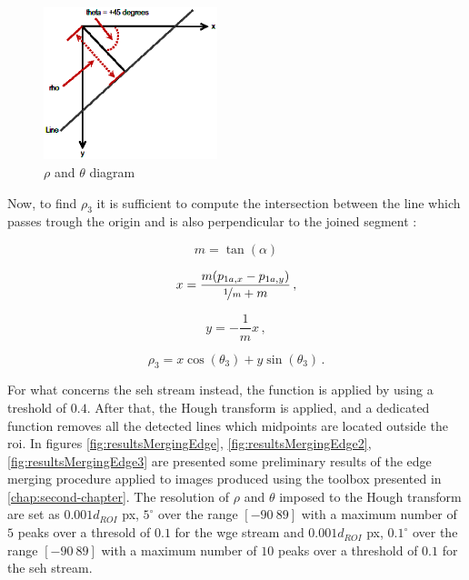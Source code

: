 \begin{figure}[htbp]
  \centering
  \includegraphics[width=0.45\textwidth]{gfx/hough_rho_theta_diagram.eps}
  \caption{$\rho$ and $\theta$ diagram}
  \label{fig:rhotheta}
\end{figure}

Now, to find $\rho_3$ it is sufficient to compute the intersection between the line which passes trough the origin and is also perpendicular to the joined segment :

\begin{equation}
  m = \tan(\alpha)
\end{equation}

\begin{equation}
  x = \frac{m(p_{1a,x}-p_{1a,y})}{\nicefrac{1}{m} + m} \,,
\end{equation}

\begin{equation}
  y = - \frac{1}{m} x \,,
\end{equation}

\begin{equation}
  \rho_3 = x \cos (\theta_3) +  y \sin (\theta_3) \,.
\end{equation}

For what concerns the \acrshort{seh} stream instead, the  function is applied by using a treshold of $0.4$. After that, the Hough transform is applied, and a dedicated function removes all the detected lines which midpoints are located outside the \acrshort{roi}.
In figures \ref{fig:resultsMergingEdge}, \ref{fig:resultsMergingEdge2}, \ref{fig:resultsMergingEdge3} are presented some preliminary results of the edge merging procedure applied to images produced using the toolbox presented in \ref{chap:second-chapter}. The resolution of $\rho$ and $\theta$ imposed to the Hough transform are set as $0.001 d_{ROI}$ px, $5^\circ$ over the range $[-90 \ 89]$ with a maximum number of $5$ peaks over a thresold of $0.1$ for the \acrshort{wge} stream and $0.001 d_{ROI}$ px, $0.1^\circ$ over the range $[-90 \ 89]$ with a maximum number of $10$ peaks over a threshold of $0.1$ for the \acrshort{seh} stream.

